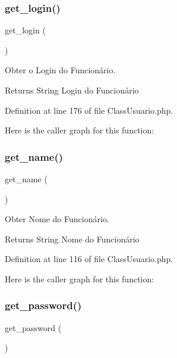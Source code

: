 \subsubsection{\texorpdfstring{get\+\_\+login()}{get\_login()}}
{\footnotesize\ttfamily get\+\_\+login (\begin{DoxyParamCaption}{ }\end{DoxyParamCaption})}



Obter o Login do Funcionário. 

\begin{DoxyReturn}{Returns}
String Login do Funcionário 
\end{DoxyReturn}


Definition at line 176 of file Class\+Usuario.\+php.

Here is the caller graph for this function\+:
\mbox{\label{class_class_usuario_a4f1149ccbd69d1ac4225b7bc2dd871bb}} 
\subsubsection{\texorpdfstring{get\+\_\+name()}{get\_name()}}
{\footnotesize\ttfamily get\+\_\+name (\begin{DoxyParamCaption}{ }\end{DoxyParamCaption})}



Obter Nome do Funcionário. 

\begin{DoxyReturn}{Returns}
String Nome do Funcionário 
\end{DoxyReturn}


Definition at line 116 of file Class\+Usuario.\+php.

Here is the caller graph for this function\+:
\mbox{\label{class_class_usuario_aded77192e5da28ea5fd228d2e5ace16a}} 
\subsubsection{\texorpdfstring{get\+\_\+password()}{get\_password()}}
{\footnotesize\ttfamily get\+\_\+password (\begin{DoxyParamCaption}{ }\end{DoxyParamCaption})}



